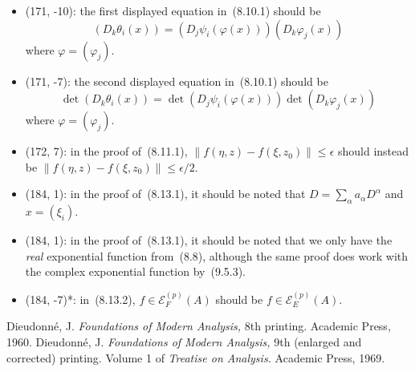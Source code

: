 \documentclass[letterpaper,12pt]{article}
\newcommand{\E}{\mathcal{E}}
\newcommand{\norm}[1]{\lVert{#1}\rVert}
\begin{document}
\begin{itemize}
\item (171, -10): the first displayed equation in~(8.10.1) should be
\[(D_k\theta_i(x))=(D_j\psi_i(\varphi(x)))(D_k\varphi_j(x))\]
where \(\varphi=(\varphi_j)\).
\item (171, -7): the second displayed equation in~(8.10.1) should be
\[\det(D_k\theta_i(x))=\det(D_j\psi_i(\varphi(x)))\det(D_k\varphi_j(x))\]
where \(\varphi=(\varphi_j)\).
\item (172, 7): in the proof of~(8.11.1), \(\norm{f(\eta,z)-f(\xi,z_0)}\le\epsilon\) should instead be \(\norm{f(\eta,z)-f(\xi,z_0)}\le\epsilon/2\).
\item (184, 1): in the proof of~(8.13.1), it should be noted that \(D=\sum_{\alpha}a_{\alpha}D^{\alpha}\) and \(x=(\xi_i)\).
\item (184, 1): in the proof of~(8.13.1), it should be noted that we only have the \emph{real} exponential function from~(8.8), although the same proof does work with the complex exponential function by~(9.5.3).
\item (184, -7)*: in~(8.13.2), \(f\in\E^{(p)}_F(A)\) should be \(f\in\E^{(p)}_E(A)\).
\end{itemize}

\begin{thebibliography}{0}
 Dieudonn\'e, J. \textit{Foundations of Modern Analysis,} 8th printing. Academic Press, 1960.
 Dieudonn\'e, J. \textit{Foundations of Modern Analysis,} 9th (enlarged and corrected) printing. Volume 1 of \emph{Treatise on Analysis.} Academic Press, 1969.
\end{thebibliography}
\end{document}
